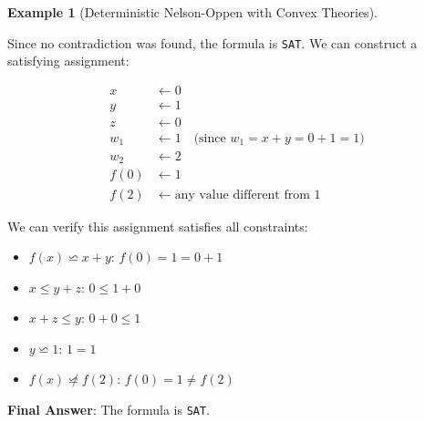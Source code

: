 \documentclass[11pt,a4paper]{article}
\theoremstyle{definition}
\newtheorem{example}{Example}[section]
\theoremstyle{plain}
\theoremstyle{remark}
\begin{document}
\begin{example}[Deterministic Nelson-Oppen with Convex Theories]
\begin{tcolorbox}[colback=blue!5!white,colframe=blue!75!black,title=\textbf{Example 1: Combining $\mathcal{T}_E$ and $\mathcal{T}_{\text{LIA}}$},breakable]
Since no contradiction was found, the formula is \texttt{SAT}. We can construct a satisfying assignment:

\begin{align*}
x &\leftarrow 0 \\
y &\leftarrow 1 \\
z &\leftarrow 0 \\
w_1 &\leftarrow 1 \quad \text{(since $w_1 = x + y = 0 + 1 = 1$)} \\
w_2 &\leftarrow 2 \\
f(0) &\leftarrow 1 \\
f(2) &\leftarrow \text{any value different from } 1
\end{align*}

We can verify this assignment satisfies all constraints:
\begin{itemize}
    \item $f(x) \backsimeq x + y$: $f(0) = 1 = 0 + 1$ \checkmark
    \item $x \leq y + z$: $0 \leq 1 + 0$ \checkmark
    \item $x + z \leq y$: $0 + 0 \leq 1$ \checkmark
    \item $y \backsimeq 1$: $1 = 1$ \checkmark
    \item $f(x) \not\backsimeq f(2)$: $f(0) = 1 \neq f(2)$ \checkmark
\end{itemize}

\vspace{0.5em}

\textbf{Final Answer}: The formula is \texttt{SAT}.
\end{tcolorbox}
\end{example} 

\newpage
\end{document}
